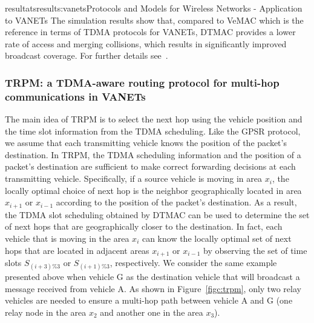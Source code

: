 \documentclass{ra2016}
\begin{document}
\begin{module}{resultats}{results:vanets}{Protocols and Models for Wireless Networks - Application to VANETs}
The simulation results show that, compared to VeMAC which is the reference in terms of TDMA protocols for VANETs, DTMAC provides a lower rate of access and merging collisions, which results in significantly improved broadcast coverage. For further details see~\cite{hadded:hal-01379216}. 

\subsubsection{TRPM: a TDMA-aware routing protocol for multi-hop communications in VANETs}

\begin{participants}
\end{participants}

The main idea of TRPM is to select the next hop using the vehicle position and the time 
slot information from the TDMA scheduling.  Like the GPSR protocol, we assume that each transmitting vehicle 
knows the position of the packet's destination. In TRPM, the TDMA scheduling information and the position of a packet's destination 
are sufficient to make correct forwarding decisions at each transmitting vehicle. Specifically, if a  source vehicle is moving in 
area $x_i$, the locally optimal choice of next hop is the neighbor geographically located in area $x_{i+1}$ or $x_{i-1}$ according 
to the position of the packet's destination. As a result, the TDMA slot scheduling obtained by DTMAC  can be used to determine the 
set of next hops that are geographically closer to the destination. In fact, each vehicle that is moving in the area $x_i$ can 
know the locally optimal set of next hops that are located in adjacent areas $x_{i+1}$ or $x_{i-1}$ by observing the set of time 
slots $S_{(i+3)\%3}$ or $S_{(i+1)\%3}$, respectively. We consider the same example presented above when vehicle G as the destination 
vehicle that will broadcast a message received from vehicle A. As shown in Figure~\ref{figc:trpm}, only two relay vehicles are needed to ensure a 
multi-hop path between vehicle A and G (one relay node in the area $x_2$ and another one in the area $x_3$). 


\end{module}
\end{document}
